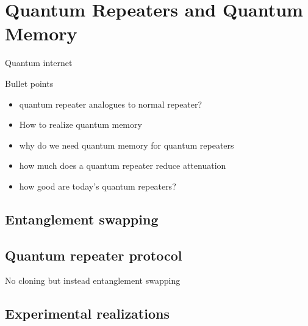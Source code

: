 \section{Quantum Repeaters and Quantum Memory}
Quantum internet \cite{Azuma:2023}
\begin{mybox}{Bullet points}
    \begin{itemize}
        \item quantum repeater analogues to normal repeater?
        \item How to realize quantum memory 
        \item why do we need quantum memory for quantum repeaters
        \item how much does a quantum repeater reduce attenuation
        \item how good are today's quantum repeaters? 
    \end{itemize}
\end{mybox}

\subsection{Entanglement swapping}

\subsection{Quantum repeater protocol}
No cloning but instead entanglement swapping

\subsection{Experimental realizations}